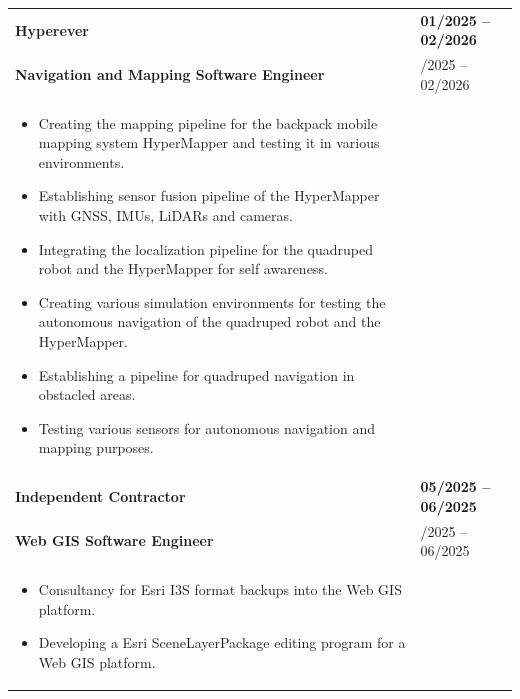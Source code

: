 \documentclass[10pt,a4paper]{article}
\begin{document}
\begin{longtable}{@{} p{} | >{\centering\arraybackslash}p{} @{}}

  \textbf{Hyperever} & \textbf{01/2025 -- 02/2026} \\
  \vspace{-5pt}
  \quad \textbf{\color{cvblue}Navigation and Mapping Software Engineer} & 01/2025 -- 02/2026 \\ [-5pt]
  \begin{itemize}
    \item Creating the mapping pipeline for the backpack mobile mapping system HyperMapper and testing it in various environments.
    \item Establishing sensor fusion pipeline of the HyperMapper with GNSS, IMUs, LiDARs and cameras.
    \item Integrating the localization pipeline for the quadruped robot and the HyperMapper for self awareness.
    \item Creating various simulation environments for testing the autonomous navigation of the quadruped robot and the HyperMapper.
    \item Establishing a pipeline for quadruped navigation in obstacled areas.
    \item Testing various sensors for autonomous navigation and mapping purposes.
  \end{itemize} & \\ [10pt]

  \vspace{-2pt}
  \textbf{Independent Contractor} & \textbf{05/2025 -- 06/2025} \\
  \vspace{-5pt}
  \quad \textbf{\color{cvblue}Web GIS Software Engineer} & 05/2025 -- 06/2025 \\ [-5pt]
  \begin{itemize}
    \item Consultancy for Esri I3S format backups into the Web GIS platform.
    \item Developing a Esri SceneLayerPackage editing program for a Web GIS platform.
  \end{itemize} & \\ [10pt]


\end{longtable}
\end{document}
